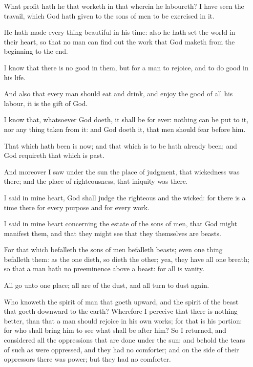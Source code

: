 \Verse What profit hath he that worketh in that wherein he laboureth?  \Verse I have seen the travail, which God hath given to the sons of men to be exercised in it.

\Verse He hath made every thing beautiful in his time: also he hath set the world in their heart, so that no man can find out the work that God maketh from the beginning to the end.

\Verse I know that there is no good in them, but for a man to rejoice, and to do good in his life.

\Verse And also that every man should eat and drink, and enjoy the good of all his labour, it is the gift of God.

\Verse I know that, whatsoever God doeth, it shall be for ever: nothing can be put to it, nor any thing taken from it: and God doeth it, that men should fear before him.

\Verse That which hath been is now; and that which is to be hath already been; and God requireth that which is past.

\Verse And moreover I saw under the sun the place of judgment, that wickedness was there; and the place of righteousness, that iniquity was there.

\Verse I said in mine heart, God shall judge the righteous and the wicked: for there is a time there for every purpose and for every work.

\Verse I said in mine heart concerning the estate of the sons of men, that God might manifest them, and that they might see that they themselves are beasts.

\Verse For that which befalleth the sons of men befalleth beasts; even one thing befalleth them: as the one dieth, so dieth the other; yea, they have all one breath; so that a man hath no preeminence above a beast: for all is vanity.

\Verse All go unto one place; all are of the dust, and all turn to dust again.

\Verse Who knoweth the spirit of man that goeth upward, and the spirit of the beast that goeth downward to the earth?  \Verse Wherefore I perceive that there is nothing better, than that a man should rejoice in his own works; for that is his portion: for who shall bring him to see what shall be after him?  
\Chapter
\Verse So I returned, and considered all the oppressions that are done under the sun: and behold the tears of such as were oppressed, and they had no comforter; and on the side of their oppressors there was power; but they had no comforter.

